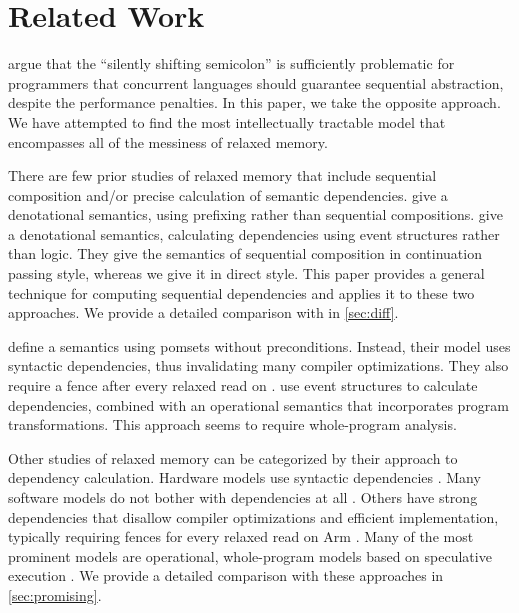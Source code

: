\section{Related Work}

\citet{DBLP:conf/snapl/MarinoMMNS15} argue that the ``silently shifting
semicolon'' is sufficiently problematic for programmers that concurrent
languages should guarantee sequential abstraction, despite the performance
penalties.  In this paper, we take the opposite approach.  We have
attempted to find the most intellectually tractable model that encompasses
all of the messiness of relaxed memory.

There are few prior studies of relaxed memory that include sequential
composition and/or precise calculation of semantic dependencies.
\citet{DBLP:journals/pacmpl/JagadeesanJR20} give a denotational semantics,
using prefixing rather than sequential compositions.
\citet{DBLP:conf/esop/PaviottiCPWOB20} give a denotational semantics,
calculating dependencies using event structures rather than logic.  They give
the semantics of sequential composition in continuation passing style,
whereas we give it in direct style.  This paper provides a general technique
for computing sequential dependencies and applies it to these two approaches.
We provide a detailed comparison with
\cite{DBLP:journals/pacmpl/JagadeesanJR20} in \textsection\ref{sec:diff}.

\citet{DBLP:journals/corr/abs-1804-04214} define a semantics
using pomsets without preconditions. Instead, their model uses syntactic
dependencies, thus invalidating many compiler optimizations.  They also
require a fence after every relaxed read on \armeight{}.
%
\citet{Pichon-Pharabod:2016:CSR:2837614.2837616} use event structures to
calculate dependencies, combined with an operational semantics that
incorporates program transformations.  This approach seems to require
whole-program analysis.

Other studies of relaxed memory can be categorized by their approach to
dependency calculation.  Hardware models use syntactic dependencies
\cite{alglave}.  Many software models do not bother with dependencies at all
\cite{Batty:2011:MCC:1926385.1926394, DBLP:journals/pacmpl/WattRP19,
  DBLP:conf/pldi/WattPPBDFPG20, goMM}.  Others have strong dependencies that
disallow compiler optimizations and efficient implementation, typically
requiring fences for every relaxed read on Arm
\cite{Lamport:1979:MMC:1311099.1311750, DBLP:conf/pldi/LahavVKHD17,
  Dolan:2018:BDR:3192366.3192421, DBLP:conf/lics/JeffreyR16,
  Boehm:2014:OGA:2618128.2618134}. %
%
Many of the most prominent models are operational, whole-program models based
on speculative execution \cite{Manson:2005:JMM:1047659.1040336,
  DBLP:conf/esop/JagadeesanPR10,
  DBLP:conf/popl/KangHLVD17,DBLP:journals/pacmpl/ChakrabortyV19,DBLP:conf/pldi/LeeCPCHLV20,promising-ldrf}.
We provide a detailed comparison with these approaches in \textsection\ref{sec:promising}.

